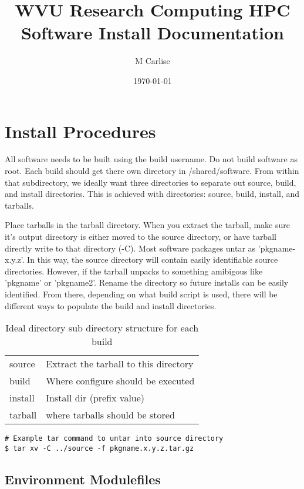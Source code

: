 \documentclass{article}
\title{WVU Research Computing HPC Software Install Documentation}
\author{M Carlise}
\date{\today}
\begin{document}
\maketitle

\newpage

\section{Install Procedures}

All software needs to be built using the build username.  Do not build software 
as root.  Each build should get there own directory in /shared/software.  From 
within that subdirectory, we ideally want three directories to separate out 
source, build, and install directories.  This is achieved with directories: 
source, build, install, and tarballs.  

Place tarballs in the tarball directory.  When you extract the tarball, make 
sure it's output directory is either moved to the source directory, or have 
tarball directly write to that directory (-C).  Most software packages untar as 
'pkgname-x.y.z'.  In this way, the source directory will contain easily 
identifiable source directories.  However, if the tarball unpacks to something 
amibigous like 'pkgname' or 'pkgname2'.  Rename the directory so future 
installs can be easily identified.  From there, depending on what build script 
is used, there will be different ways to populate the build and install 
directories.

\begin{center}
\begin{table}[h]
\begin{tabular}{ll}
		source & Extract the tarball to this directory \\
		build & Where configure should be executed \\
		install & Install dir (prefix value) \\
		tarball & where tarballs should be stored \\
\end{tabular}
\caption {Ideal directory sub directory structure for each build}
\end{table}
\end{center}

\begin{verbatim}
# Example tar command to untar into source directory
$ tar xv -C ../source -f pkgname.x.y.z.tar.gz
\end{verbatim}

\subsection{Environment Modulefiles}
\end{document}
